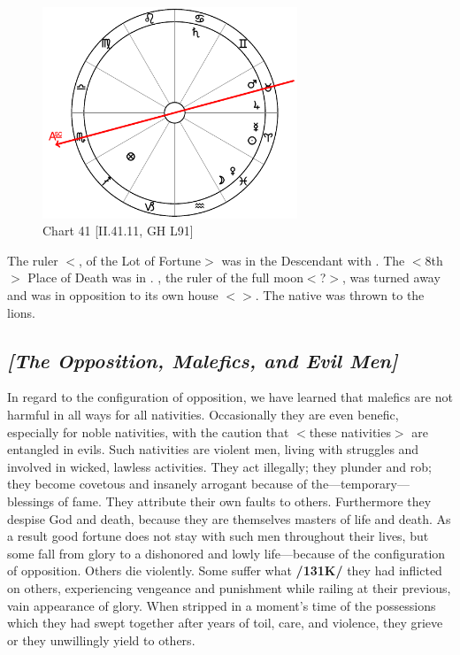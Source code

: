 \clearpage
\begin{figure}
\centering
\vspace{-20pt}
\includegraphics[width=0.68\textwidth]{charts/2_41_11}
\caption{Chart 41 [II.41.11, GH L91]}
\label{fig:chart41}
\end{figure} 

The ruler $<$\Jupiter, of the Lot of Fortune$>$ was in the Descendant with \Mars. The $<$8th$>$ Place of Death was in \Cancer. \Saturn, the ruler of the full moon$<$?$>$, was turned away and \Mars\xspace was in opposition to its own house $<$\Scorpio$>$. The native was thrown to the lions.
\newpage
\subsection{\textit{[The Opposition, Malefics, and Evil Men]}}
In \mnmb regard to the configuration of opposition, we have learned that malefics are not harmful in all ways for all nativities. Occasionally they are even benefic, especially for noble nativities, with the caution that $<$these nativities$>$ are entangled in evils. Such nativities are violent men, living with struggles and involved in wicked, lawless activities. They act illegally; they plunder and rob; they become covetous and insanely arrogant because of the—temporary—blessings of fame. They attribute their own faults to others. Furthermore they despise God and death, because they are themselves masters of life and death. As a result good fortune does not stay with such men throughout their lives, but some fall from glory to a dishonored and lowly life—because of the configuration of opposition. Others die violently. Some suffer what \textbf{/131K/} they had inflicted on others, experiencing vengeance and punishment while railing at their previous, vain appearance of glory. When stripped in a moment’s time of the possessions which they had swept together
after years of toil, care, and violence, they grieve or they unwillingly yield to others. 

